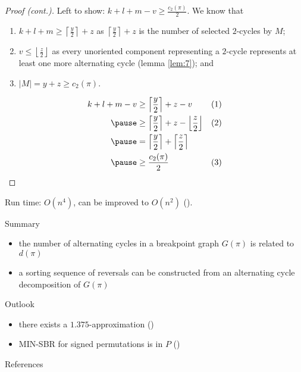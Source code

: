 \documentclass{beamer}
\theoremstyle{definition}
\def\spadding{\vspace{0.25cm}}
\begin{document}
\begin{frame}

\begin{proof}[Proof (cont.)]
Left to show: $k+l+m-v \geq \frac{c_2(\pi)}{2}$. \pause We know that
\begin{enumerate}
    \item $k+l+m \geq \left\lceil \frac{y}{2} \right\rceil + z$ as $\left\lceil \frac{y}{2} \right\rceil + z$ is the number of selected $2$-cycles by $M$\pause;
    \item $v \leq \left\lfloor \frac{z}{2} \right\rfloor$ as every unoriented component representing a $2$-cycle represents at least one more alternating cycle (lemma \ref{lem:7})\pause; and
    \item $|M| = y+z \geq c_2(\pi)$.
\end{enumerate}\pause
\begin{align*}
    k+l+m-v &\geq \left\lceil \frac{y}{2} \right\rceil + z - v                                          & (1) \\ \pause
            &\geq \left\lceil \frac{y}{2} \right\rceil + z - \left\lfloor \frac{z}{2} \right\rfloor     & (2) \\ \pause
            &= \left\lceil \frac{y}{2} \right\rceil + \left\lceil \frac{z}{2} \right\rceil \\ \pause
            &\geq \frac{c_2(\pi)}{2}                                                                    & (3)
\end{align*}
\end{proof}

\end{frame}

\begin{frame}

Run time: $O(n^4)$, can be improved to $O(n^2)$ (\citeauthor*{Kaplan1997}).\spadding

\begin{block}{Summary}
\begin{itemize}
    \item the number of alternating cycles in a breakpoint graph $G(\pi)$ is related to $d(\pi)$
    \item a sorting sequence of reversals can be constructed from an alternating cycle decomposition of $G(\pi)$
\end{itemize}
\end{block}

\begin{block}{Outlook}
\begin{itemize}
    \item there exists a $1.375$-approximation (\citeauthor*{Berman2001})
    \item MIN-SBR for signed permutations is in $P$ (\citeauthor*{Hannenhalli1995})
\end{itemize}
\end{block}

\end{frame}

\begin{frame}[allowframebreaks]{References}

\nocite{*}
\printbibliography

\end{frame}
\end{document}

